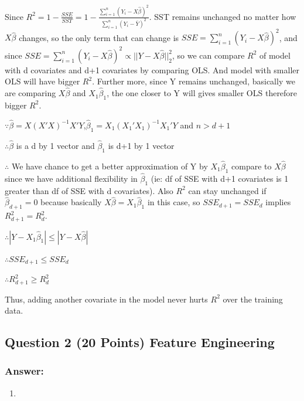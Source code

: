 \documentclass[
]{article}
\providecommand{\tightlist}{%
  \setlength{\itemsep}{0pt}\setlength{\parskip}{0pt}}
\begin{document}
Since
\(R^2=1-\frac{SSE}{SST}=1-\frac{\sum_{i=1}^{n}(Y_i-X\widehat{\beta})^2}{\sum_{i=1}^{n}(Y_i-\bar{Y})^2}\).
SST remains unchanged no matter how \(X\widehat{\beta}\) changes, so the
only term that can change is
\(SSE=\sum_{i=1}^{n}(Y_i-X\widehat{\beta})^2\), and since
\(SSE=\sum_{i=1}^{n}(Y_i-X\widehat{\beta})^2 \propto ||Y-X\widehat{\beta}||_2^2\),
so we can compare \(R^2\) of model with d covariates and d+1 covariates
by comparing OLS. And model with smaller OLS will have bigger \(R^2\).
Further more, since Y remains unchanged, basically we are comparing
\(X\widehat{\beta}\) and \(X_1\widehat{\beta}_1\), the one closer to Y
will gives smaller OLS therefore bigger \(R^2\).

\(\because \widehat{\beta}=X(X'X)^{-1}X'Y\),\(\widehat{\beta}_1=X_1(X_1'X_1)^{-1}X_1'Y\)
and \(n>d+1\)

\(\therefore \widehat{\beta}\) is a d by 1 vector and
\(\widehat{\beta}_1\) is d+1 by 1 vector

\(\therefore\) We have chance to get a better approximation of Y by
\(X_1\widehat{\beta}_1\) compare to \(X\widehat{\beta}\) since we have
additional flexibility in \(\widehat{\beta}_1\) (ie: df of SSE with d+1
covariates is 1 greater than df of SSE with d covariates). Also \(R^2\)
can stay unchanged if \(\widehat{\beta}_{d+1}=0\) because basically
\(X\widehat{\beta}=X_1\widehat{\beta}_1\) in this case, so
\(SSE_{d+1}=SSE_d\) implies \(R^2_{d+1}=R^2_d\).

\(\therefore |Y-X_1\widehat{\beta}_1|\leq|Y-X\widehat{\beta}|\)

\(\therefore SSE_{d+1} \leq SSE_d\)

\(\therefore R^2_{d+1}\geq R^2_d\)

Thus, adding another covariate in the model never hurts \(R^2\) over the
training data.

\hypertarget{question-2-20-points-feature-engineering}{%
\subsection{Question 2 (20 Points) Feature
Engineering}\label{question-2-20-points-feature-engineering}}

\hypertarget{answer-1}{%
\subsubsection{Answer:}\label{answer-1}}

\begin{enumerate}
\def\labelenumi{(\alph{enumi})}
\tightlist
\item
\end{enumerate}
\end{document}
